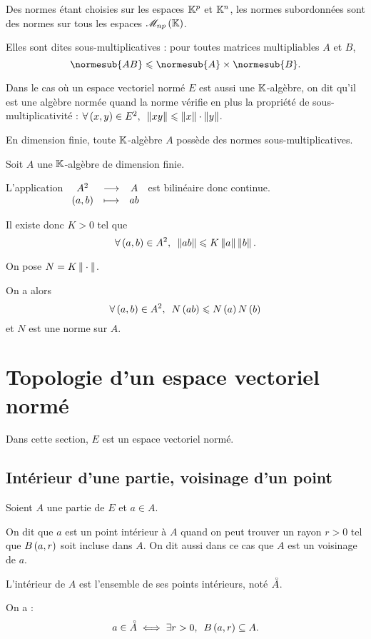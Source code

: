 \begin{prop}
Des normes étant choisies sur les espaces \(\mathbb{K}^p\) et \(\mathbb{K}^n\), les normes subordonnées sont des normes sur tous les espaces \(\M{np}\).

Elles sont dites sous-multiplicatives : pour toutes matrices multipliables \(A\) et \(B\), \[\normesub{AB}\leq\normesub{A}\times\normesub{B}.\]
\end{prop}

\begin{rem}
Dans le cas où un espace vectoriel normé \(E\) est aussi une \(\mathbb{K}\)-algèbre, on dit qu'il est une algèbre normée quand la norme vérifie en plus la propriété de sous-multiplicativité : \(\quantifs{\forall\paren{x,y}\in E^2}\norme{xy}\leq\norme{x}\cdot\norme{y}\).
\end{rem}

\begin{rem}
En dimension finie, toute \(\mathbb{K}\)-algèbre \(A\) possède des normes sous-multiplicatives.
\end{rem}

\begin{dem}
Soit \(A\) une \(\mathbb{K}\)-algèbre de dimension finie.

L'application \(\begin{array}[t]{ccc}A^2 & \longrightarrow & A \\ \left(a,b\right) & \longmapsto & ab\end{array}\) est bilinéaire donc continue.

Il existe donc \(K>0\) tel que \[\quantifs{\forall\paren{a,b}\in A^2}\norme{ab}\leq K\norme{a}\norme{b}.\]

On pose \(N=K\norme{}\).

On a alors \[\quantifs{\forall\paren{a,b}\in A^2}N\paren{ab}\leq N\paren{a}N\paren{b}\] et \(N\) est une norme sur \(A\).
\end{dem}

\section{Topologie d'un espace vectoriel normé}

Dans cette section, \(E\) est un espace vectoriel normé.

\subsection{Intérieur d'une partie, voisinage d'un point}

\begin{defi}
Soient \(A\) une partie de \(E\) et \(a\in A\).

On dit que \(a\) est un point intérieur à \(A\) quand on peut trouver un rayon \(r>0\) tel que \(\bouleo{a}{r}\) soit incluse dans \(A\). On dit aussi dans ce cas que \(A\) est un voisinage de \(a\).

L'intérieur de \(A\) est l'ensemble de ses points intérieurs, noté \(\accentset{\circ}{A}\).

On a : \[a\in\interieur{A}\ssi\quantifs{\exists r>0}\bouleo{a}{r}\subset A.\]
\end{defi}

